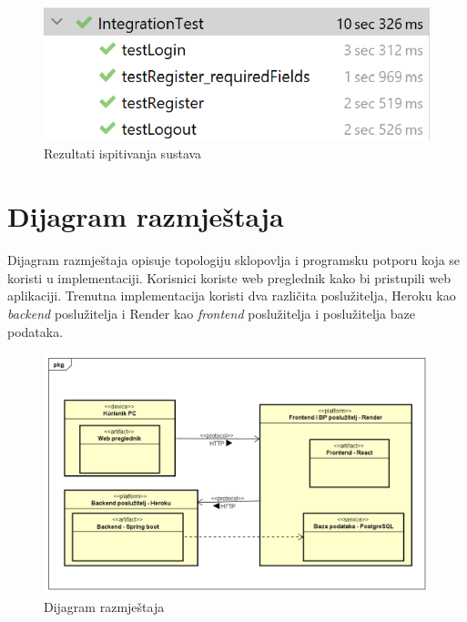                 \begin{figure}[H]
        		\includegraphics[scale=1]{slike/integration_test_results.png} 
        		  \centering
        		\caption{Rezultati ispitivanja sustava}
        	\end{figure}
		
			\eject 
		
		
		\section{Dijagram razmještaja}
			
			

            Dijagram razmještaja opisuje topologiju sklopovlja i programsku potporu koja se koristi u implementaciji. Korisnici koriste web preglednik kako bi pristupili web aplikaciji. Trenutna implementacija koristi dva različita poslužitelja, Heroku kao \textit{backend} poslužitelja i Render kao \textit{frontend} poslužitelja i poslužitelja baze podataka.
			\begin{figure}[H]
        		\includegraphics[scale=0.55]{slike/Dijagram razmjeÅ¡taja.png} %
        		  \centering
        		\caption{Dijagram razmještaja}

        	\end{figure}
			\eject 
		
